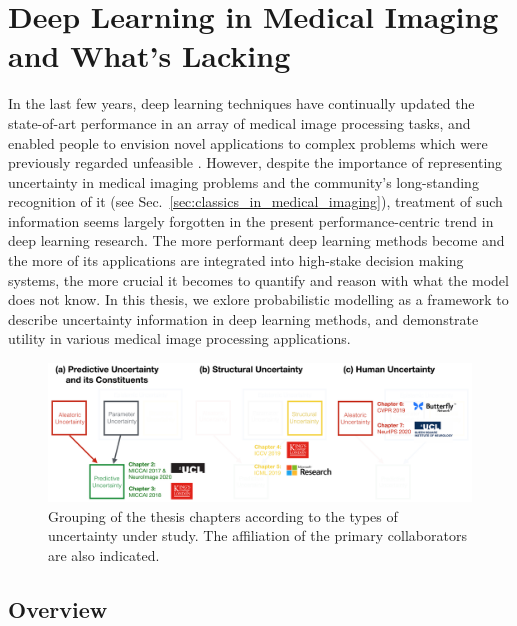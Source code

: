\section{Deep Learning in Medical Imaging and What's Lacking} 
In the last few years, deep learning techniques have continually updated the state-of-art performance in an array of medical image processing tasks, and enabled people to envision novel applications to complex problems which were previously regarded unfeasible \cite{shen2017deep,litjens2017survey}. However, despite the importance of representing uncertainty in medical imaging problems and the community's long-standing recognition of it (see Sec.~\ref{sec:classics_in_medical_imaging}), treatment of such information seems largely forgotten in the present performance-centric trend in deep learning research. The more performant deep learning methods become and the more of its applications are integrated into high-stake decision making systems, the more crucial it becomes to quantify and reason with what the model does not know. In this thesis, we exlore probabilistic modelling as a framework to describe uncertainty information in deep learning methods, and demonstrate utility in various medical image processing applications. 

\begin{figure}[ht]
	\includegraphics[width=\linewidth]{chapter_1/thesis_structure_03.png}
	\centering	
	\vspace{-2mm}
	\caption{\small Grouping of the thesis chapters according to the types of uncertainty under study. The affiliation of the primary collaborators are also indicated. } 
	\label{fig:thesis_structure}
\end{figure}

\subsection*{Overview}

